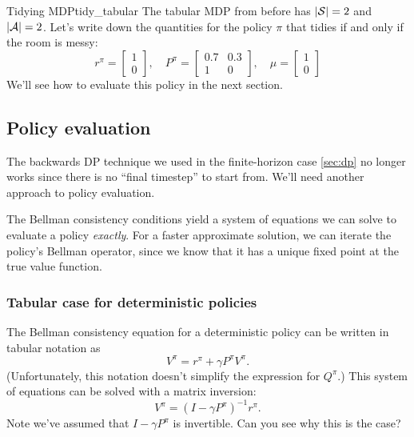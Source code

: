 \documentclass[\main/main]{subfiles}
\begin{document}
\begin{example}{Tidying MDP}{tidy_tabular}
    The tabular MDP from before has $|\S| = 2$ and $|\A| = 2$. Let's write down the quantities for the policy $\pi$ that tidies if and only if the room is messy:
    \[
        r^{\pi} = \begin{bmatrix} 1 \\ 0 \end{bmatrix}, \quad
        P^{\pi} = \begin{bmatrix} 0.7 & 0.3 \\ 1 & 0 \end{bmatrix}, \quad
        \mu = \begin{bmatrix} 1 \\ 0 \end{bmatrix}
    \]
    We'll see how to evaluate this policy in the next section.
\end{example}

\subsection{Policy evaluation}

The backwards DP technique we used in the finite-horizon case \eqref{sec:dp} no longer works since there is no ``final timestep'' to start from. We'll need another approach to policy evaluation.

The Bellman consistency conditions yield a system of equations we can solve to evaluate a policy \emph{exactly}. For a faster approximate solution, we can iterate the policy's Bellman operator, since we know that it has a unique fixed point at the true value function.


\subsubsection{Tabular case for deterministic policies}

The Bellman consistency equation for a deterministic policy can be written in tabular notation as
\[
    V^\pi = r^\pi + \gamma P^\pi V^\pi.
\]
(Unfortunately, this notation doesn't simplify the expression for $Q^\pi$.) This system of equations can be solved with a matrix inversion:
\begin{equation}
    V^\pi = (I - \gamma P^\pi)^{-1} r^\pi. \label{eq:matrix_inversion_pe}
\end{equation}
Note we've assumed that $I - \gamma P^\pi$ is invertible. Can you see why this is the case?
\end{document}
